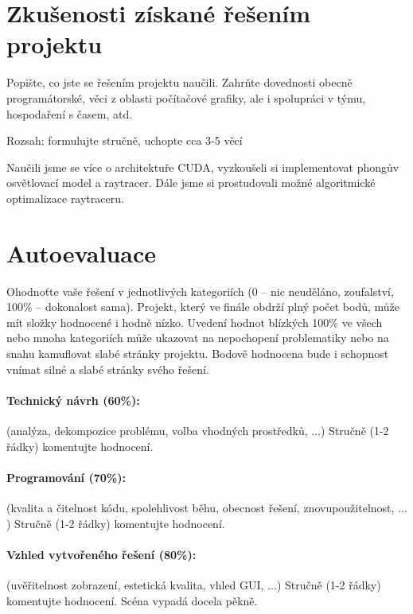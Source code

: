 \documentclass[12pt,a4paper,titlepage,final]{report}
\begin{document}
\section{Zkušenosti získané řešením projektu}

Popište, co jste se řešením projektu naučili. Zahrňte dovednosti obecně
programátorské, věci z oblasti počítačové grafiky, ale i spolupráci v týmu,
hospodaření s časem, atd.

Rozsah: formulujte stručně, uchopte cca 3-5 věcí

Naučili jsme se více o architektuře CUDA, vyzkoušeli si implementovat phongův osvětlovací model a
raytracer. Dále jsme si prostudovali možné algoritmické optimalizace raytraceru.

\section{Autoevaluace}

Ohodnoťte vaše řešení v jednotlivých kategoriích (0 – nic neuděláno,
zoufalství, 100\% – dokonalost sama). Projekt, který ve finále obdrží plný
počet bodů, může mít složky hodnocené i hodně nízko. Uvedení hodnot blízkých
100\% ve všech nebo mnoha kategoriích může ukazovat na nepochopení problematiky
nebo na snahu kamuflovat slabé stránky projektu. Bodově hodnocena bude i
schopnost vnímat silné a slabé stránky svého řešení.

\paragraph{Technický návrh (60\%):} (analýza, dekompozice problému, volba
vhodných prostředků, $\ldots$) 
Stručně (1-2 řádky) komentujte hodnocení. 

\paragraph{Programování (70\%):} (kvalita a čitelnost kódu, spolehlivost běhu,
obecnost řešení, znovupoužitelnost, $\ldots$)
Stručně (1-2 řádky) komentujte hodnocení. 

\paragraph{Vzhled vytvořeného řešení (80\%):} (uvěřitelnost zobrazení,
estetická kvalita, vhled GUI, $\ldots$)
Stručně (1-2 řádky) komentujte hodnocení. 
Scéna vypadá docela pěkně.
\end{document}

